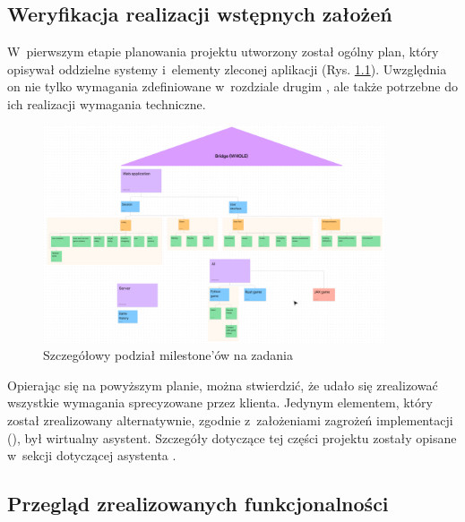 \chapter{\ChapterTitleResults}
\label{sec:wyniki-projektu}

\section{Weryfikacja realizacji wstępnych założeń}

W~pierwszym etapie planowania projektu utworzony został ogólny
plan, który opisywał oddzielne systemy i~elementy
zleconej aplikacji (Rys. \ref{fig:figma_strategicplan}).
Uwzględnia on nie tylko wymagania zdefiniowane w~rozdziale drugim
, ale także potrzebne do ich
realizacji wymagania techniczne.

\begin{figure}[h!]
    \centering
    \includegraphics[width=0.9\textwidth]{img/schematy/milestones.png}
    \caption{Szczegółowy podział milestone'ów na zadania}
    \label{fig:figma_strategicplan}
\end{figure}

Opierając się na powyższym planie, można stwierdzić, że udało się
zrealizować wszystkie wymagania sprecyzowane przez klienta.
Jedynym elementem, który został zrealizowany alternatywnie,
zgodnie z~założeniami zagrożeń implementacji
(), był wirtualny asystent. Szczegóły
dotyczące tej części projektu zostały opisane w~sekcji dotyczącej
asystenta .

\section{Przegląd zrealizowanych funkcjonalności}

